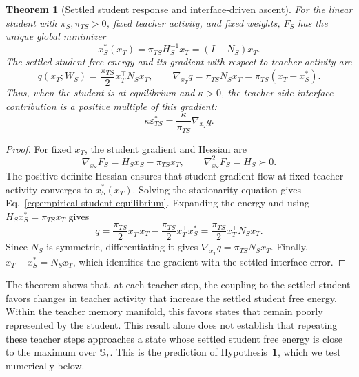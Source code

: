 \documentclass[10pt,letterpaper]{article}
\theoremstyle{plain}
\newtheorem{theorem}{Theorem}
\theoremstyle{remark}
\begin{document}
\begin{theorem}[Settled student response and interface-driven ascent]
\label{thm:empirical-interface-ascent}
For the linear student with \(\pi_S,\pi_{TS}>0\), fixed teacher activity, and fixed weights, \(F_S\) has the unique global minimizer
\begin{equation}
x_S^*(x_T)=\pi_{TS}H_S^{-1}x_T=(I-N_S)x_T.
\label{eq:empirical-student-equilibrium}
\end{equation}
The settled student free energy and its gradient with respect to teacher activity are
\begin{equation}
q(x_T;W_S)=\frac{\pi_{TS}}{2}x_T^\top N_Sx_T,
\qquad
\nabla_{x_T}q=\pi_{TS}N_Sx_T
=\pi_{TS}(x_T-x_S^*).
\label{eq:empirical-interface-gradient}
\end{equation}
Thus, when the student is at equilibrium and \(\kappa>0\), the teacher-side interface contribution is a positive multiple of this gradient:
\begin{equation}
\kappa\varepsilon_{TS}^*
=\frac{\kappa}{\pi_{TS}}\nabla_{x_T}q.
\label{eq:empirical-interface-ascent}
\end{equation}
\end{theorem}

\begin{proof}
For fixed \(x_T\), the student gradient and Hessian are
\[
\nabla_{x_S}F_S=H_Sx_S-\pi_{TS}x_T,
\qquad \nabla_{x_S}^2F_S=H_S\succ0.
\]
The positive-definite Hessian ensures that student gradient flow at fixed teacher activity converges to \(x_S^*(x_T)\).
Solving the stationarity equation gives Eq.~\eqref{eq:empirical-student-equilibrium}. Expanding the energy and using \(H_Sx_S^*=\pi_{TS}x_T\) gives
\[
q=\frac{\pi_{TS}}{2}x_T^\top x_T
-\frac{\pi_{TS}}{2}x_T^\top x_S^*
=\frac{\pi_{TS}}{2}x_T^\top N_Sx_T.
\]
Since \(N_S\) is symmetric, differentiating it gives \(\nabla_{x_T}q=\pi_{TS}N_Sx_T\). Finally, \(x_T-x_S^*=N_Sx_T\), which identifies the gradient with the settled interface error.
\end{proof}


The theorem shows that, at each teacher step, the coupling to the settled student favors changes in teacher activity that increase the settled student free energy. Within the teacher memory manifold, this favors states that remain poorly represented by the student. This result alone does not establish that repeating these teacher steps approaches a state whose settled student free energy is close to the maximum over \(\mathbb S_T\). This is the prediction of Hypothesis~\textbf{1}, which we test numerically below.
\end{document}
